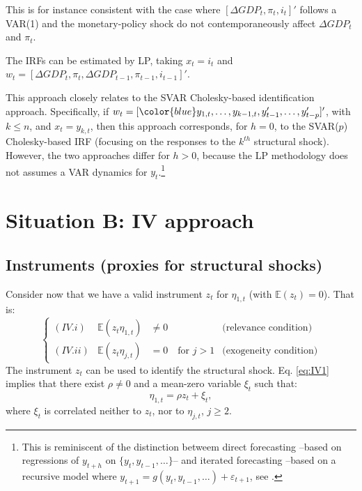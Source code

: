 \documentclass[
  12pt,
]{book}
\theoremstyle{definition}
\theoremstyle{definition}
\theoremstyle{definition}
\theoremstyle{definition}
\theoremstyle{remark}
\begin{document}
This is for instance consistent with the case where \([\Delta GDP_t, \pi_t,i_t]'\) follows a VAR(1) and the monetary-policy shock do not contemporaneously affect \(\Delta GDP_t\) and \(\pi_t\).

The IRFs can be estimated by LP, taking \(x_t = i_t\) and \(w_t = [\Delta GDP_t,\pi_t,\Delta GDP_{t-1}, \pi_{t-1},i_{t-1}]'\).

This approach closely relates to the SVAR Cholesky-based identification approach. Specifically, if \(w_t = [{\color{blue}y_{1,t},\dots,y_{k-1,t}}, y_{t-1}',\dots,y_{t-p}']'\), with \(k\le n\), and \(x_t = y_{k,t}\), then this approach corresponds, for \(h=0\), to the SVAR(\(p\)) Cholesky-based IRF (focusing on the responses to the \(k^{th}\) structural shock). However, the two approaches differ for \(h>0\), because the LP methodology does not assumes a VAR dynamics for \(y_t\).\footnote{This is reminiscent of the distinction betweem direct forecasting --based on regressions of \(y_{t+h}\) on \(\{y_t,y_{t-1},\dots\}\)-- and iterated forecasting --based on a recursive model where \(y_{t+1} = g(y_t,y_{t-1},\dots)+\varepsilon_{t+1}\), see \citet{Marcellino_et_al_2006}.}

\hypertarget{situation-b-iv-approach}{%
\section{Situation B: IV approach}\label{situation-b-iv-approach}}

\hypertarget{instruments-proxies-for-structural-shocks}{%
\subsection{Instruments (proxies for structural shocks)}\label{instruments-proxies-for-structural-shocks}}

Consider now that we have a valid instrument \(z_t\) for \(\eta_{1,t}\) (with \(\mathbb{E}(z_t)=0\)). That is:
\begin{equation}
\left\{
\begin{array}{llll}
(IV.i) & \mathbb{E}(z_t \eta_{1,t}) &\ne 0 & \mbox{(relevance condition)} \\
(IV.ii) & \mathbb{E}(z_t \eta_{j,t}) &= 0 \quad \mbox{for } j>1 & \mbox{(exogeneity condition)}
\end{array}\right.\label{eq:IV1}
\end{equation}
The instrument \(z_t\) can be used to identify the structural shock. Eq. \eqref{eq:IV1} implies that there exist \(\rho \ne 0\) and a mean-zero variable \(\xi_t\) such that:
\[
\eta_{1,t} = \rho z_t + \xi_t,
\]
where \(\xi_t\) is correlated neither to \(z_t\), nor to \(\eta_{j,t}\), \(j\ge2\).
\end{document}
